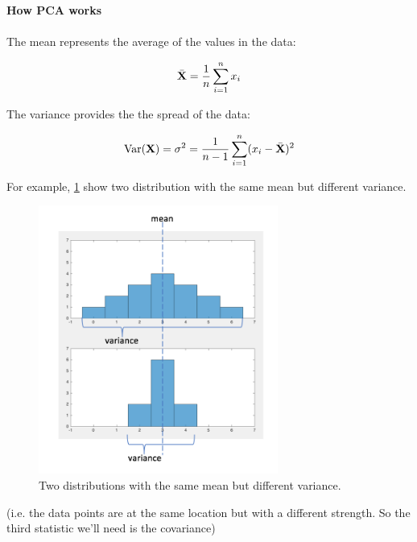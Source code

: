 \documentclass[11pt, oneside]{article}   	%
\begin{document}
\paragraph{How PCA works}
\paragraph{}

The mean represents the average of the values in the data:

\begin{equation}
   \bar{{\bf X}} = \frac{1}{n} \sum_{i=1}^{n} x_i 
\end{equation}

The variance provides the the spread of the data:

\begin{equation}
   \text{Var} ({\bf X}) = \sigma^2  = \frac{1}{n-1} \sum_{i=1}^{n} ( x_i -  \bar{{\bf X}})^2
\end{equation}


For example, \ref{fig:MeanVariance} show two distribution with the same mean but different variance. 

\begin{figure}[!h]
	\centering
	\includegraphics[width=0.7\textwidth]{same-mean_different-variance}
	\caption{Two distributions with the same mean but different variance.}
	\label{fig:MeanVariance}
\end{figure}


(i.e. the data points are at the same location but with a different strength. So the third statistic we'll need is the covariance)
\end{document}
